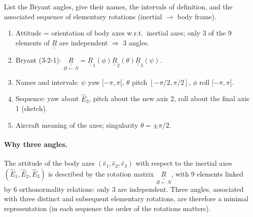 \begin{qbox}
List the Bryant angles, give their names, the intervals of definition, and the associated sequence of elementary rotations
(inertial $\to$ body frame).
\end{qbox}

\begin{outline}
\begin{enumerate}
\item Attitude = orientation of body axes w.r.t.\ inertial axes; only 3 of the 9 elements of $\underline{\underline R}$ are independent $\Rightarrow$ 3 angles.
\item Bryant (3-2-1): $\underset{B\leftarrow N}{\underline{\underline R}}=\underline{\underline R}_1(\phi)\underline{\underline R}_2(\theta)\underline{\underline R}_3(\psi)$.
\item Names and intervals: $\psi$ yaw $[-\pi,\pi[$, $\theta$ pitch $[-\pi/2,\pi/2]$, $\phi$ roll $[-\pi,\pi[$.
\item Sequence: yaw about $\hat E_3$, pitch about the new axis 2, roll about the final axis 1 (sketch).
\item Aircraft meaning of the axes; singularity $\theta=\pm\pi/2$.
\end{enumerate}
\end{outline}

\answer
\paragraph{Why three angles.} The attitude of the body axes $(\hat e_1,\hat e_2,\hat e_3)$ with respect to the inertial axes $(\hat E_1,\hat E_2,\hat E_3)$
is described by the rotation matrix $\underset{B\leftarrow N}{\underline{\underline R}}$, with 9 elements linked by 6 orthonormality relations:
only 3 are independent. Three angles, associated with three distinct and subsequent elementary rotations, are therefore a minimal
representation (in each sequence the order of the rotations matters).

